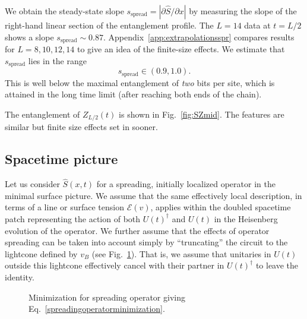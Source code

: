 \documentclass[aps,prx,twocolumn,superscriptaddress,floatfix,nofootinbib,prx]{revtex4}
\renewcommand{\>}{\right\rangle}
\newcommand{\<}{\left\langle}
\newcommand{\be}{\begin{equation}}
\newcommand{\ee}{\end{equation}}
\newcommand{\sspr}{s_\text{spread}}
\newcommand{\lt}{\mathcal{E}}
\begin{document}
We obtain the steady-state slope $\sspr = |\partial \hat S/\partial x|$ by measuring the slope of the right-hand linear section of the entanglement profile. The $L=14$ data at $t=L/2$ shows a slope $\sspr \sim 0.87$. Appendix~\ref{app:extrapolationsspr} compares results for $L=8,10,12,14$ to give an idea of the finite-size effects. We estimate that $\sspr$ lies in the range 
\be 
\sspr \in (0.9,1.0).
\ee
This is well below the maximal entanglement of \textit{two} bits per site, which is attained in the long time limit (after reaching both ends of the chain).

The entanglement of $Z_{L/2}(t)$ is shown in Fig.~\ref{fig:SZmid}. The features are similar but finite size effects set in sooner.




\subsection{Spacetime picture}

Let us consider $\hat S(x,t)$ for a spreading, initially localized operator in the minimal surface picture. We assume that the same effectively local description, in terms of a line or surface tension $\lt(v)$, applies within the doubled spacetime patch representing the action of both $U(t)^\dag$ and $U(t)$ in the Heisenberg evolution of the operator. We  further assume that the effects of operator spreading can be taken into account simply by ``truncating'' the circuit to the lightcone defined by $v_B$ (see Fig.~\ref{fig:spreadingoperatorcut}). That is, we assume that unitaries in $U(t)$ outside this lightcone effectively cancel with their partner in  $U(t)^\dag$ to leave the identity.



\begin{figure}[t]
\caption{
Minimization for spreading operator giving Eq.~\ref{spreadingoperatorminimization}.}  \label{fig:spreadingoperatorcut}
\end{figure}
\end{document}
